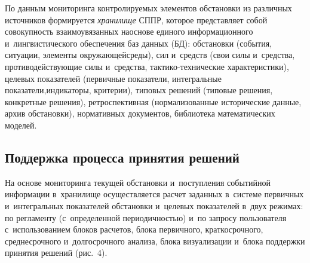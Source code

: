 \begin{multicols}{2}
    По данным мониторинга контролируемых элементов обстановки из 
различных источников формируется \textit{хранилище} СППР, которое 
пред\-став\-ляет собой совокупность взаимоувязанных на\linebreak основе единого 
информационного и~лингвистического обеспечения баз данных (БД): 
обстановки (события, ситуации, элементы окружающей\linebreak среды), сил и~средств 
(свои силы и~средства, противодействующие силы и~средства, так\-ти\-ко-тех\-ни\-че\-ские
характеристики), целевых 
показателей (первичные показатели, интегральные показатели,\linebreak индикаторы, 
критерии), типовых решений (типовые решения, конкретные решения), 
ретроспективная (нормализованные исторические данные, архив 
обстановки), нормативных документов, биб\-лио\-те\-ка математических моделей.

\vspace*{-6pt}

\subsection{Поддержка процесса принятия решений}

\vspace*{-2pt}

    На основе мониторинга текущей обстановки и~поступления событийной 
информации в~хранилище осуществляется расчет заданных в~сис\-те\-ме 
первичных и~интегральных показателей обстановки и~целевых показателей 
в~двух режимах: по регламенту (с~определенной периодичностью) и~по 
запросу пользователя с~использованием блоков расчетов, блока первичного, 
краткосрочного, среднесрочного и~долгосрочного анализа, блока 
визуализации  и~блока поддержки принятия решений (рис.~4).\linebreak\vspace*{-12pt}


\pagebreak

\end{multicols}
\begin{figure*} %
\vspace*{1pt}
\begin{center}
\mbox{%
\epsfxsize=157.334mm
}
\end{center}
\vspace*{-6pt}
\vspace*{6pt}
\end{figure*}

